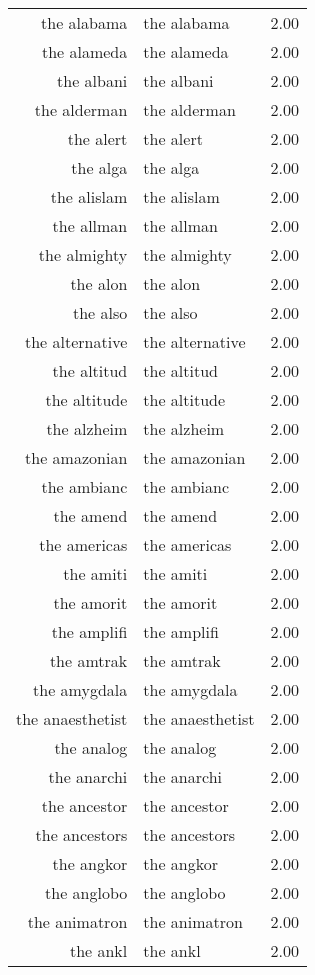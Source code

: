\begin{table}[ht]
\begin{tabular}{rlr}
  the alabama & the alabama & 2.00 \\ 
  the alameda & the alameda & 2.00 \\ 
  the albani & the albani & 2.00 \\ 
  the alderman & the alderman & 2.00 \\ 
  the alert & the alert & 2.00 \\ 
  the alga & the alga & 2.00 \\ 
  the alislam & the alislam & 2.00 \\ 
  the allman & the allman & 2.00 \\ 
  the almighty & the almighty & 2.00 \\ 
  the alon & the alon & 2.00 \\ 
  the also & the also & 2.00 \\ 
  the alternative & the alternative & 2.00 \\ 
  the altitud & the altitud & 2.00 \\ 
  the altitude & the altitude & 2.00 \\ 
  the alzheim & the alzheim & 2.00 \\ 
  the amazonian & the amazonian & 2.00 \\ 
  the ambianc & the ambianc & 2.00 \\ 
  the amend & the amend & 2.00 \\ 
  the americas & the americas & 2.00 \\ 
  the amiti & the amiti & 2.00 \\ 
  the amorit & the amorit & 2.00 \\ 
  the amplifi & the amplifi & 2.00 \\ 
  the amtrak & the amtrak & 2.00 \\ 
  the amygdala & the amygdala & 2.00 \\ 
  the anaesthetist & the anaesthetist & 2.00 \\ 
  the analog & the analog & 2.00 \\ 
  the anarchi & the anarchi & 2.00 \\ 
  the ancestor & the ancestor & 2.00 \\ 
  the ancestors & the ancestors & 2.00 \\ 
  the angkor & the angkor & 2.00 \\ 
  the anglobo & the anglobo & 2.00 \\ 
  the animatron & the animatron & 2.00 \\ 
  the ankl & the ankl & 2.00 \\ 

\end{tabular}
\end{table}
